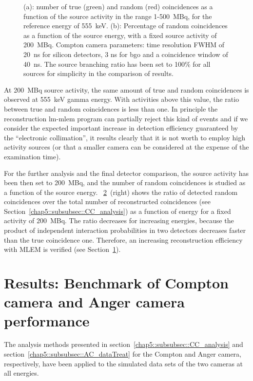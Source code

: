 \begin{figure}
\begin{subfigure}[t]{.5\textwidth}
  \label{chap5::fig::timing_energy}
\end{subfigure}
\caption{(a): number of true (green) and random (red) coincidences as a function of the source activity in the range 1-500~MBq, for the reference energy of 555~keV. (b): Percentage of random coincidences as a function of the source energy, with a fixed source activity of 200~MBq. Compton camera parameters: time resolution FWHM of 20~ns for silicon detectors, 3 ns for \gls{bgo} and a coincidence window of 40~ns. The source branching ratio has been set to 100\% for all sources for simplicity in the comparison of results.}
\label{chap5::fig::timig_en_coinc}
\end{figure} 

At 200~MBq source activity, the same amount of true and random coincidences is observed at 555~keV gamma energy. With activities above this value, the ratio between true and random coincidences is less than one. In principle the reconstruction \gls{lm-mlem} program can partially reject this kind of events and if we consider the expected important increase in detection efficiency guaranteed by the \enquote{electronic collimation}, it results clearly that it is not worth to employ high activity sources (or that a smaller camera can be considered at the expense of the examination time).

For the further analysis and the final detector comparison, the source activity has been then set to 200~MBq, and the number of random coincidences is studied as a function of the source energy. \figurename~\ref{chap5::fig::timig_en_coinc}~(right) shows the ratio of detected random coincidences over the total number of reconstructed coincidences (see Section~\ref{chap5::subsubsec::CC_analysis}) as a function of energy for a fixed activity of 200~MBq. The ratio decreases for increasing energies, because the product of
independent interaction probabilities in two detectors decreases faster
than the true coincidence one. Therefore, an increasing reconstruction
efficiency with MLEM is verified (see Section~\ref{chap5::sec::Results_benchmark}).

\section{Results: Benchmark of Compton camera and Anger camera performance}\label{chap5::sec::Results_benchmark}

The analysis methods presented in section~\ref{chap5::subsubsec::CC_analysis} and section~\ref{chap5::subsubsec::AC_dataTreat} for the Compton and Anger camera, respectively, have been applied to the simulated data sets of the two cameras at all energies.


